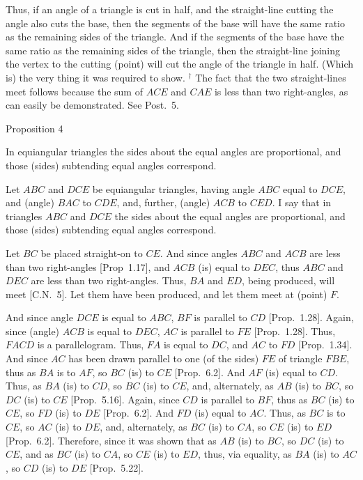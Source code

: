 Thus, if an angle of a triangle is cut in half, and the
straight-line cutting the angle also cuts the base, then the segments of the base
will have the same ratio as the remaining sides of the triangle. And if
the segments of the base have the same ratio as the remaining sides of the
triangle, then the straight-line joining the vertex to the cutting (point) will
cut the angle of the triangle in half. (Which is) the very thing it was required
to show.
{\footnotesize \noindent$^\dag$ The fact that the
two straight-lines meet follows because the sum of $ACE$ and $CAE$
is less than two right-angles, as can easily be demonstrated. See Post.~5.}


\begin{center}
{\large Proposition 4}
\end{center}

In equiangular triangles the sides about the
equal angles are proportional, and those (sides) subtending equal angles
 correspond.
 
\epsfysize=2.2in
\centerline{}

Let $ABC$ and $DCE$ be equiangular triangles, having angle $ABC$ equal to
$DCE$, and (angle) $BAC$ to $CDE$, and, further,  (angle) $ACB$ to $CED$.
I say that  in triangles $ABC$ and $DCE$ the sides about the equal angles
are proportional, and those (sides) subtending equal angles
 correspond.
 
Let $BC$ be placed straight-on to $CE$. And since angles
$ABC$ and $ACB$ are less than two right-angles  [Prop~1.17], and
$ACB$ (is) equal to $DEC$, thus $ABC$ and $DEC$ are less than two right-angles.
Thus, $BA$ and $ED$, being produced, will meet  [C.N.~5]. Let them have been produced,
and let them meet at (point) $F$.

And since angle $DCE$ is equal to $ABC$, $BF$ is parallel to $CD$  [Prop.~1.28]. Again, since (angle) $ACB$ is equal to $DEC$,  $AC$ is
 parallel to $FE$  [Prop.~1.28]. Thus, $FACD$ is a parallelogram.
Thus, $FA$ is equal to $DC$, and $AC$ to $FD$  [Prop.~1.34]. And since
$AC$ has been drawn parallel to one (of the sides) $FE$ of triangle
$FBE$, thus as $BA$ is to $AF$, so $BC$ (is) to $CE$ [Prop.~6.2]. And $AF$ (is) equal to $CD$.
Thus, as $BA$ (is) to $CD$, so $BC$ (is) to $CE$, and, alternately, as $AB$
(is) to $BC$, so $DC$ (is) to $CE$ [Prop.~5.16].
Again, since $CD$ is parallel to $BF$, thus as $BC$ (is) to $CE$, so
$FD$ (is) to $DE$ [Prop.~6.2]. And $FD$ (is) equal to
$AC$. Thus, as $BC$ is to $CE$, so $AC$ (is) to $DE$, and, alternately, as $BC$ (is)
to $CA$, so $CE$ (is) to $ED$ [Prop.~6.2].
Therefore, since
it was shown that as $AB$ (is) to $BC$, so $DC$ (is) to $CE$, and
as $BC$ (is) to $CA$, so $CE$ (is) to $ED$, thus, via equality, as
$BA$ (is) to $AC$, so $CD$ (is) to $DE$ [Prop.~5.22].

